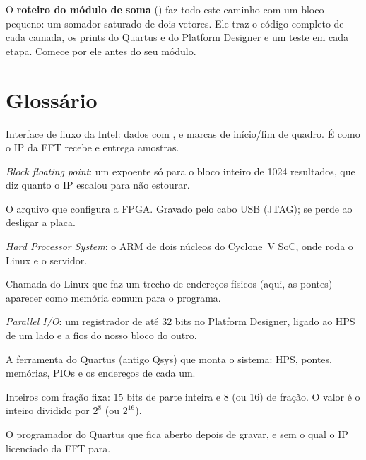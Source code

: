 \documentclass[11pt,a4paper,oneside]{article}
\begin{document}
\begin{pronto}
O \textbf{roteiro do módulo de soma} () faz todo este
caminho com um bloco pequeno: um somador saturado de dois vetores. Ele traz o
código completo de cada camada, os prints do Quartus e do Platform Designer e
um teste em cada etapa. Comece por ele antes do seu módulo.
\end{pronto}

\section*{Glossário}

\begin{description}[itemsep=0pt]
  \item[Avalon-ST] Interface de fluxo da Intel: dados com ,
     e marcas de início/fim de quadro. É como o IP da FFT recebe e
    entrega amostras.
  \item[BFP] \emph{Block floating point}: um expoente só para o bloco inteiro
    de 1024 resultados, que diz quanto o IP escalou para não estourar.
  \item[bitstream (\arq{.sof})] O arquivo que configura a FPGA. Gravado pelo
    cabo USB (JTAG); se perde ao desligar a placa.
  \item[HPS] \emph{Hard Processor System}: o ARM de dois núcleos do Cyclone~V
    SoC, onde roda o Linux e o servidor.
  \item[\arq{mmap}] Chamada do Linux que faz um trecho de endereços físicos
    (aqui, as pontes) aparecer como memória comum para o programa.
  \item[PIO] \emph{Parallel I/O}: um registrador de até 32 bits no Platform
    Designer, ligado ao HPS de um lado e a fios do nosso bloco do outro.
  \item[Platform Designer] A ferramenta do Quartus (antigo Qsys) que monta o
    sistema: HPS, pontes, memórias, PIOs e os endereços de cada um.
  \item[Q15.8, Q15.16] Inteiros com fração fixa: 15 bits de parte inteira e 8
    (ou 16) de fração. O valor é o inteiro dividido por \(2^8\) (ou \(2^{16}\)).
  \item[tether] O programador do Quartus que fica aberto depois de gravar, e
    sem o qual o IP licenciado da FFT para.
\end{description}
\end{document}
